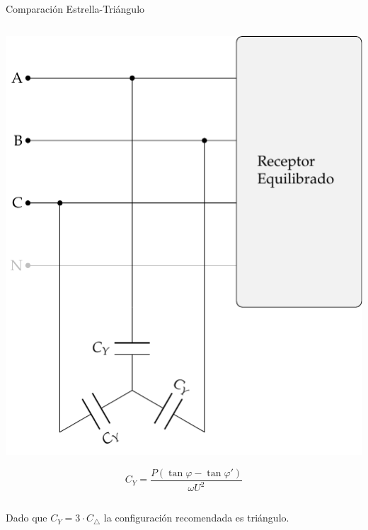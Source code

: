 \documentclass[aspectratio=169, usenames,svgnames,dvipsnames]{beamer}
\begin{document}
\begin{frame}[label={sec:org9b44b45}]{Comparación Estrella-Triángulo}
\begin{columns}
\begin{column}{0.5\columnwidth}
\begin{center}
\includegraphics[height=0.55\textheight]{../figs/CircuitoTrifasicaY_CompensacionReactiva.pdf}
\end{center}
\[
  \boxed{C_Y = \frac{P(\tan \varphi - \tan \varphi')}{\omega U^2}}
\]

\medskip
\end{column}
\end{columns}

Dado que \(C_Y = 3 \cdot C_\triangle\) la \alert{configuración recomendada} es \alert{triángulo}.
\end{frame}
\end{document}

